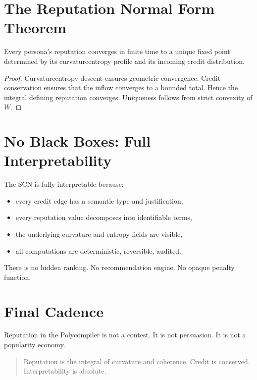 \section{The Reputation Normal Form Theorem}

\begin{theorem}
Every persona’s reputation converges in finite time to a unique
fixed point determined by its curvature\textendash entropy profile and
its incoming credit distribution.
\end{theorem}

\begin{proof}
Curvature\textendash entropy descent ensures geometric convergence.
Credit conservation ensures that the inflow converges to a bounded total.
Hence the integral defining reputation converges.
Uniqueness follows from strict convexity of $W$.
\end{proof}

\section{No Black Boxes: Full Interpretability}

The SCN is fully interpretable because:

\begin{itemize}
  \item every credit edge has a semantic type and justification,
  \item every reputation value decomposes into identifiable terms,
  \item the underlying curvature and entropy fields are visible,
  \item all computations are deterministic, reversible, audited.
\end{itemize}

There is no hidden ranking.  
No recommendation engine.  
No opaque penalty function.

\section{Final Cadence}

Reputation in the Polycompiler is not a contest.
It is not persuasion.
It is not a popularity economy.

\begin{quote}
Reputation is the integral of curvature and coherence.  
Credit is conserved.  
Interpretability is absolute.
\end{quote}
